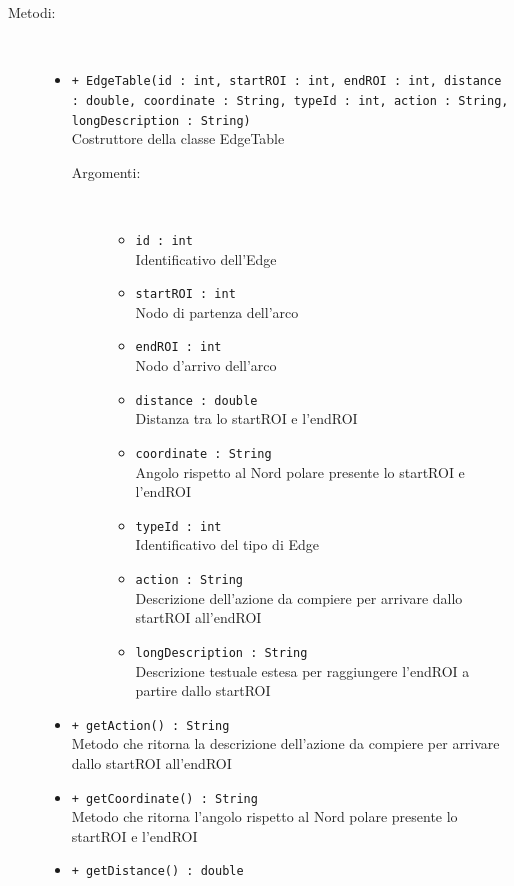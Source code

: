 \documentclass[../DefinizioneDiProdotto.tex]{subfiles}
\begin{document}
\begin{description}
\begin{itemize}
	\end{itemize}
	\item[Metodi:] \
	\begin{itemize}
		\item \texttt{+ EdgeTable(id : int, startROI : int, endROI : int, distance : double, coordinate : String, typeId : int, action : String, longDescription : String)}\\
		Costruttore della classe EdgeTable
		\begin{description}
			\item[Argomenti:] \
			\begin{itemize}
				\item \texttt{id : int}\\
				Identificativo dell'Edge\item \texttt{startROI : int}\\
				Nodo di partenza dell'arco\item \texttt{endROI : int}\\
				Nodo d'arrivo dell'arco\item \texttt{distance : double}\\
				Distanza tra lo startROI e l'endROI\item \texttt{coordinate : String}\\
				Angolo rispetto al Nord polare presente lo startROI e l'endROI\item \texttt{typeId : int}\\
				Identificativo del tipo di Edge\item \texttt{action : String}\\
				Descrizione dell'azione da compiere per arrivare dallo startROI all'endROI\item \texttt{longDescription : String}\\
				Descrizione testuale estesa per raggiungere l'endROI a partire dallo startROI\end{itemize}
		\end{description}
		\item \texttt{+ getAction() : String}\\
		Metodo che ritorna la descrizione dell'azione da compiere per arrivare dallo startROI all'endROI
		\item \texttt{+ getCoordinate() : String}\\
		Metodo che ritorna l'angolo rispetto al Nord polare presente lo startROI e l'endROI
		\item \texttt{+ getDistance() : double}\\

\end{itemize}
\end{description}
\end{document}
